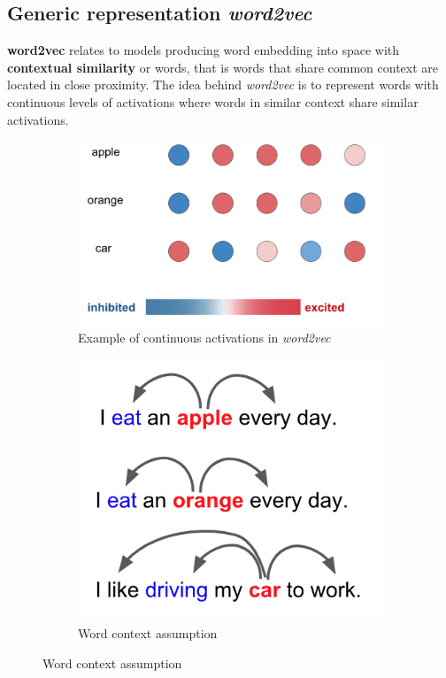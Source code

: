 \documentclass[11pt]{article}
\begin{document}
\subsection{Generic representation \emph{word2vec}}
\textbf{word2vec} relates to models producing word embedding into space with \textbf{contextual similarity} or words, that is words that share common context are located in close proximity. The idea behind \emph{word2vec} is to represent words with continuous levels of activations where words in similar context share similar activations.

\begin{figure}[htb]
	\begin{subfigure}[t]{0.5\linewidth}
		\centering
		\includegraphics[width=\linewidth]{word2vec_continuous_activation}
		\caption{Example of continuous activations in \emph{word2vec}}
	\end{subfigure}
	\begin{subfigure}[t]{0.5\linewidth}
		\centering
		\includegraphics[width=0.8\linewidth]{word2vec_words_context}
		\caption{Word context assumption}
	\end{subfigure}
\end{figure}
\end{document}
